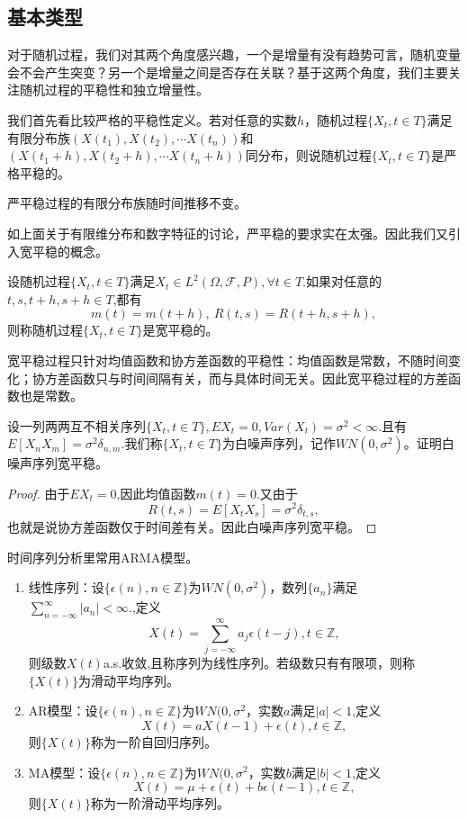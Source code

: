 \documentclass[lang=cn,10pt]{elegantbook}
\begin{document}
	\subsection{基本类型}
	对于随机过程，我们对其两个角度感兴趣，一个是增量有没有趋势可言，随机变量会不会产生突变？另一个是增量之间是否存在关联？基于这两个角度，我们主要关注随机过程的平稳性和独立增量性。
	\begin{definition}[严平稳]
		我们首先看比较严格的平稳性定义。若对任意的实数\(h\)，随机过程\(\{X_t,t\in T\}\)满足有限分布族\((X(t_1),X(t_2),\cdots X(t_n))\)和\((X(t_1+h),X(t_2+h),\cdots X(t_n+h))\)同分布，则说随机过程\(\{X_t,t\in T\}\)是严格平稳的。
	\end{definition}
    严平稳过程的有限分布族随时间推移不变。

	如上面关于有限维分布和数字特征的讨论，严平稳的要求实在太强。因此我们又引入宽平稳的概念。
	\begin{definition}[宽平稳]
		设随机过程\(\{X_t,t\in T\}\)满足\(X_t\in L^2(\Omega,\mathcal{F},P),\forall t\in T.\)如果对任意的\(t,s,t+h,s+h\in T\),都有
		\[m(t)=m(t+h),\ R(t,s)=R(t+h,s+h),\]
		则称随机过程\(\{X_t,t\in T\}\)是宽平稳的。
	\end{definition}
	\begin{note}
		宽平稳过程只针对均值函数和协方差函数的平稳性：均值函数是常数，不随时间变化；协方差函数只与时间间隔有关，而与具体时间无关。因此宽平稳过程的方差函数也是常数。
	\end{note}
	\begin{example}[白噪声序列]
		设一列两两互不相关序列\(\{X_t,t\in T\},EX_t=0, Var(X_t)=\sigma^2<\infty.\)且有\(E[X_nX_m]=\sigma^2\delta_{n,m}.\)我们称\(\{X_t,t\in T\}\)为白噪声序列，记作\(WN(0,\sigma^2)\)。证明白噪声序列宽平稳。
	\end{example}
	\begin{proof}
		由于\(EX_t=0\),因此均值函数\(m(t)=0.\)又由于
		\[R(t,s)=E[X_tX_s]=\sigma^2\delta_{t,s},\]
		也就是说协方差函数仅于时间差有关。因此白噪声序列宽平稳。
	\end{proof}
	时间序列分析里常用ARMA模型。
	\begin{example}[ARMA]
		\begin{enumerate}
			\item 线性序列：设\(\{\epsilon(n),n\in \mathbb{Z}\}\)为\(WN(0,\sigma^2)\)，数列\(\{a_n\}\)满足\(\sum_{n=-\infty}^{\infty}|a_n|<\infty.\),定义
			\[X(t)=\sum_{j=-\infty}^{\infty}a_j\epsilon(t-j),t\in \mathbb{Z},\]
			则级数\(X(t)\)a.s.收敛,且称序列为线性序列。若级数只有有限项，则称\(\{X(t)\}\)为滑动平均序列。
			\item AR模型：设\(\{\epsilon(n),n\in \mathbb{Z}\}\)为\(WN(0,\sigma^2\)，实数\(a\)满足\(|a|<1\),定义
			\[X(t)=aX(t-1)+\epsilon(t),t\in \mathbb{Z},\]
			则\(\{X(t)\}\)称为一阶自回归序列。
			\item MA模型：设\(\{\epsilon(n),n\in \mathbb{Z}\}\)为\(WN(0,\sigma^2\)，实数\(b\)满足\(|b|<1\),定义
			\[X(t)=\mu+\epsilon(t)+b\epsilon(t-1),t\in \mathbb{Z},\]
			则\(\{X(t)\}\)称为一阶滑动平均序列。
		\end{enumerate}
	\end{example}
\end{document}
